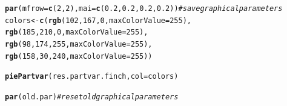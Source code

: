 \documentclass[12pt]{article}\usepackage[]{graphicx}\usepackage[]{color}
\makeatletter
\newcommand{\hlnum}[1]{\textcolor[rgb]{0.686,0.059,0.569}{#1}}%
\newcommand{\hlcom}[1]{\textcolor[rgb]{0.678,0.584,0.686}{\textit{#1}}}%
\newcommand{\hlstd}[1]{\textcolor[rgb]{0.345,0.345,0.345}{#1}}%
\newcommand{\hlkwb}[1]{\textcolor[rgb]{0.69,0.353,0.396}{#1}}%
\newcommand{\hlkwc}[1]{\textcolor[rgb]{0.333,0.667,0.333}{#1}}%
\newcommand{\hlkwd}[1]{\textcolor[rgb]{0.737,0.353,0.396}{\textbf{#1}}}%
\newenvironment{kframe}{%
 \def\at@end@of@kframe{}%
 \ifinner\ifhmode%
  \def\at@end@of@kframe{\end{minipage}}%
  \begin{minipage}{\columnwidth}%
 \fi\fi%
 \def\FrameCommand##1{\hskip\@totalleftmargin \hskip-\fboxsep
 \colorbox{shadecolor}{##1}\hskip-\fboxsep
     \hskip-\linewidth \hskip-\@totalleftmargin \hskip\columnwidth}%
 \MakeFramed {\advance\hsize-\width
   \@totalleftmargin\z@ \linewidth\hsize
   \@setminipage}}%
 {\par\unskip\endMakeFramed%
 \at@end@of@kframe}
\newenvironment{knitrout}{}{} %
\makeatother
\begin{document}
\begin{knitrout}
\color{fgcolor}\begin{kframe}
\begin{alltt}
\hlkwd{par}\hlstd{(}\hlkwc{mfrow} \hlstd{=} \hlkwd{c}\hlstd{(}\hlnum{2}\hlstd{,}\hlnum{2}\hlstd{),} \hlkwc{mai} \hlstd{=} \hlkwd{c}\hlstd{(}\hlnum{0.2}\hlstd{,}\hlnum{0.2}\hlstd{,}\hlnum{0.2}\hlstd{,}\hlnum{0.2}\hlstd{))} \hlcom{#save graphical parameters}
\hlstd{colors}\hlkwb{<-}\hlkwd{c}\hlstd{(}\hlkwd{rgb}\hlstd{(}\hlnum{102}\hlstd{,}\hlnum{167}\hlstd{,}\hlnum{0}\hlstd{,} \hlkwc{maxColorValue} \hlstd{=} \hlnum{255}\hlstd{),}
     \hlkwd{rgb}\hlstd{(}\hlnum{185}\hlstd{,}\hlnum{210}\hlstd{,}\hlnum{0}\hlstd{,} \hlkwc{maxColorValue} \hlstd{=} \hlnum{255}\hlstd{),}
     \hlkwd{rgb}\hlstd{(}\hlnum{98}\hlstd{,}\hlnum{174}\hlstd{,}\hlnum{255}\hlstd{,} \hlkwc{maxColorValue} \hlstd{=} \hlnum{255}\hlstd{),}
     \hlkwd{rgb}\hlstd{(}\hlnum{158}\hlstd{,}\hlnum{30}\hlstd{,}\hlnum{240}\hlstd{,} \hlkwc{maxColorValue} \hlstd{=} \hlnum{255}\hlstd{))}

\hlkwd{piePartvar}\hlstd{(res.partvar.finch,} \hlkwc{col} \hlstd{= colors)}
\end{alltt}


{\ttfamily\noindent\bfseries{}}\begin{alltt}
\hlkwd{par}\hlstd{(old.par)} \hlcom{#reset old graphical parameters}
\end{alltt}
\end{kframe}
\end{knitrout}
\end{document}
